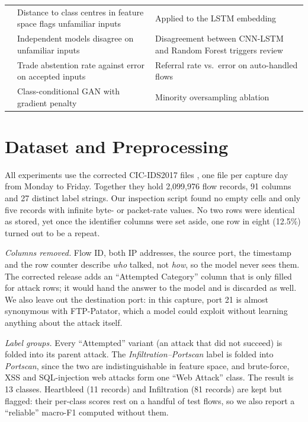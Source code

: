 \documentclass[conference]{IEEEtran}
\begin{document}
\begin{table}[t]
\begin{tabular}{p{2.6cm}p{6.2cm}p{7.6cm}}
\cite{lee2018simple} & Distance to class centres in feature space flags unfamiliar inputs & Applied to the LSTM embedding \\
\cite{lakshminarayanan2017simple} & Independent models disagree on unfamiliar inputs & Disagreement between CNN-LSTM and Random Forest triggers review \\
\cite{geifman2017selective} & Trade abstention rate against error on accepted inputs & Referral rate vs.\ error on auto-handled flows \\
\cite{mirza2014conditional,gulrajani2017improved} & Class-conditional GAN with gradient penalty & Minority oversampling ablation \\
\bottomrule
\end{tabular}
\end{table}

\section{Dataset and Preprocessing}
All experiments use the corrected CIC-IDS2017 files \cite{engelen2021troubleshooting,liu2022error},
one file per capture day from Monday to Friday. Together they hold 2,099,976 flow records, 91
columns and 27 distinct label strings. Our inspection script found no empty cells and only five
records with infinite byte- or packet-rate values. No two rows were identical as stored, yet once
the identifier columns were set aside, one row in eight (12.5\%) turned out to be a repeat.

\textit{Columns removed.} Flow ID, both IP addresses, the source port, the timestamp and the row
counter describe \emph{who} talked, not \emph{how}, so the model never sees them. The corrected
release adds an ``Attempted Category'' column that is only filled for attack rows; it would hand
the answer to the model and is discarded as well. We also leave out the destination port: in this
capture, port 21 is almost synonymous with FTP-Patator, which a model could exploit without
learning anything about the attack itself.

\textit{Label groups.} Every ``Attempted'' variant (an attack that did not succeed) is folded into
its parent attack. The \textit{Infiltration--Portscan} label is folded into \textit{Portscan},
since the two are indistinguishable in feature space, and brute-force, XSS and SQL-injection web
attacks form one ``Web Attack'' class. The result is 13 classes. Heartbleed (11 records) and
Infiltration (81 records) are kept but flagged: their per-class scores rest on a handful of test
flows, so we also report a ``reliable'' macro-F1 computed without them.
\end{document}
